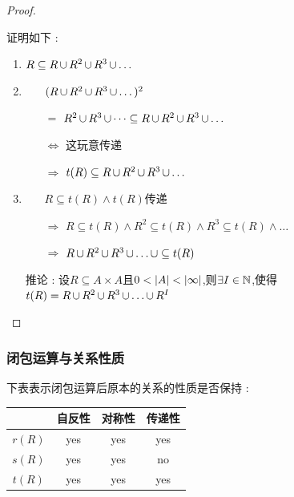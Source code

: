 {{{\begin{proof}
\begin{itemize}
{            证明如下 : \begin{enumerate}
              \item $R \subseteq R \operatorname{\cup} R^2 \operatorname{\cup} R^3 \operatorname{\cup} \dots$
              \item {
                    \begin{itemize}
                      \item[] $(R \operatorname{\cup} R^2 \operatorname{\cup} R^3 \operatorname{\cup} \dots)^2$
                      \item[$=$] $R^2 \operatorname{\cup} R^3 \operatorname{\cup} \dots \subseteq R \operatorname{\cup} R^2 \operatorname{\cup} R^3 \operatorname{\cup} \dots$
                      \item[$\Leftrightarrow$]这玩意传递
                      \item[$\Rightarrow$] $t(R) \subseteq R \operatorname{\cup} R^2 \operatorname{\cup} R^3 \operatorname{\cup} \dots$
                    \end{itemize}
                    }
              \item {
                    \begin{itemize}
                      \item[] $R \subseteq t(R) \land t(R)$传递
                      \item[$\Rightarrow$] $R \subseteq t(R) \land R^2 \subseteq t(R) \land R^3 \subseteq t(R) \land \dots$
                      \item[$\Rightarrow$] $R \operatorname{\cup} R^2 \operatorname{\cup} R^3 \operatorname{\cup} \dots \operatorname{\cup} \subseteq t(R)$
                    \end{itemize}

                    推论 : 设$R \subseteq A \times A$且$0 < \left\lvert A \right\vert < \left\lvert \infty \right\vert$,则$\exists I \in \operatorname{\mathbb{N}}$,使得$t(R) = R \operatorname{\cup} R^2 \operatorname{\cup} R^3 \operatorname{\cup} \dots \operatorname{\cup} R^I$
                    }
            \end{enumerate}
            }
    \end{itemize}
  \end{proof}
}%

\subsubsection{闭包运算与关系性质}{
  下表表示闭包运算后原本的关系的性质是否保持 :

  \begin{center}
    \begin{tabular}{|c|c|c|c|}
      \hline
      ~      & 自反性 & 对称性 & 传递性 \\
      \hline
      $r(R)$ & yes    & yes    & yes    \\
      \hline
      $s(R)$ & yes    & yes    & no     \\
      \hline
      $t(R)$ & yes    & yes    & yes    \\
      \hline
    \end{tabular}
  \end{center}

}}}
